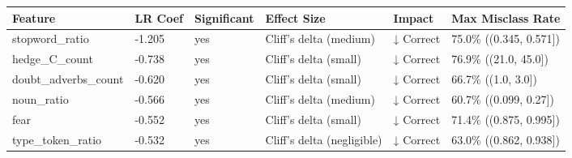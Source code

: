 \begin{tabular}{llllll}
\toprule
Feature & LR Coef & Significant & Effect Size & Impact & Max Misclass Rate \\
\midrule
stopword\_ratio & -1.205 & yes & Cliff's delta (medium) & ↓ Correct & 75.0\% ((0.345, 0.571]) \\
hedge\_C\_count & -0.738 & yes & Cliff's delta (small) & ↓ Correct & 76.9\% ((21.0, 45.0]) \\
doubt\_adverbs\_count & -0.620 & yes & Cliff's delta (small) & ↓ Correct & 66.7\% ((1.0, 3.0]) \\
noun\_ratio & -0.566 & yes & Cliff's delta (medium) & ↓ Correct & 60.7\% ((0.099, 0.27]) \\
fear & -0.552 & yes & Cliff's delta (small) & ↓ Correct & 71.4\% ((0.875, 0.995]) \\
type\_token\_ratio & -0.532 & yes & Cliff's delta (negligible) & ↓ Correct & 63.0\% ((0.862, 0.938]) \\
\bottomrule
\end{tabular}
